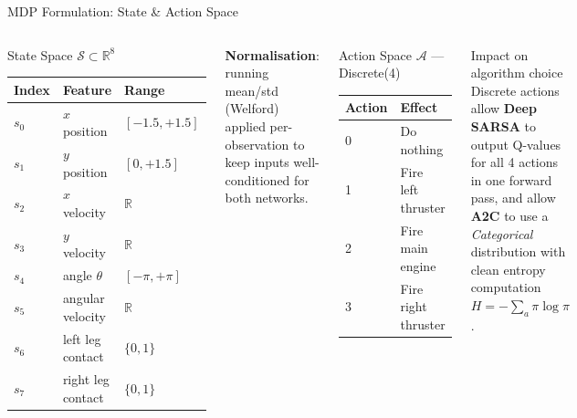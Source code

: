 \documentclass[aspectratio=169, 10pt]{beamer}
\newcommand{\keyword}[1]{{\color{cyan}\textit{#1}}}
\begin{document}
\begin{frame}{MDP Formulation: State \& Action Space}
  \begin{columns}[T]
      \begin{block}{State Space $\mathcal{S} \subset \mathbb{R}^8$}
        \vspace{0.3em}
        \small
        \begin{tabular}{lll}
          \toprule
          \textbf{Index} & \textbf{Feature} & \textbf{Range}\\
          \midrule
          $s_0$ & $x$ position     & $[-1.5, +1.5]$\\
          $s_1$ & $y$ position     & $[0, +1.5]$\\
          $s_2$ & $x$ velocity     & $\mathbb{R}$\\
          $s_3$ & $y$ velocity     & $\mathbb{R}$\\
          $s_4$ & angle $\theta$   & $[-\pi, +\pi]$\\
          $s_5$ & angular velocity & $\mathbb{R}$\\
          $s_6$ & left leg contact & $\{0, 1\}$\\
          $s_7$ & right leg contact& $\{0, 1\}$\\
          \bottomrule
        \end{tabular}
        \vspace{0.3em}
      \end{block}
      \textbf{Normalisation}: running mean/std (Welford) applied
      per-observation to keep inputs well-conditioned for both networks.
      \begin{block}{Action Space $\mathcal{A}$ --- Discrete(4)}
        \vspace{0.3em}
        \begin{tabular}{ll}
          \toprule
          \textbf{Action} & \textbf{Effect}\\
          \midrule
          0 & Do nothing\\
          1 & Fire left thruster\\
          2 & Fire main engine\\
          3 & Fire right thruster\\
          \bottomrule
        \end{tabular}
      \end{block}
      \vspace{0.5em}
      \begin{alertblock}{Impact on algorithm choice}
        Discrete actions allow \textbf{Deep SARSA} to output Q-values
        for all 4 actions in one forward pass, and allow \textbf{A2C}
        to use a \keyword{Categorical} distribution with clean entropy
        computation $H = -\sum_a \pi \log \pi$.
      \end{alertblock}
  \end{columns}
\end{frame}
\end{document}
